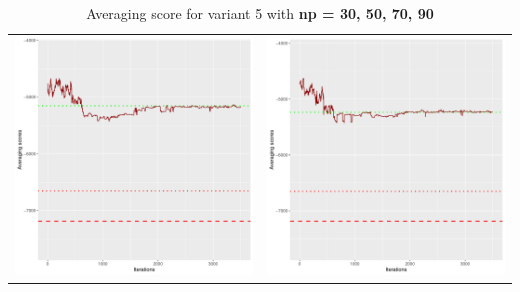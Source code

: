 \documentclass[]{scrartcl}
\begin{document}
\begin{table}[h!]
\begin{tabular}{cc}
\includegraphics[scale = 0.4]{./figs/alarm/v5/70/avgBoundsEvolution-3502.pdf} & 
\includegraphics[scale = 0.4]{./figs/alarm/v5/90/avgBoundsEvolution-3502.pdf} \\
\end{tabular}
\caption{Averaging score for variant 5 with \textbf{np =  30, 50, 70, 90 }}
\end{table}
\end{document}
